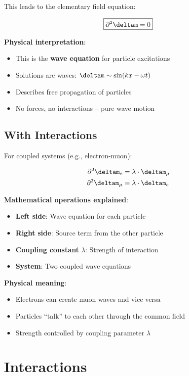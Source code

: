 	This leads to the elementary field equation:
	
	\begin{equation}
		\boxed{\partial^2 \deltam = 0}
		\label{eq:field_equation}
	\end{equation}
	
	\textbf{Physical interpretation}: 
	\begin{itemize}
		\item This is the \textbf{wave equation} for particle excitations
		\item Solutions are waves: $\deltam \sim \sin(kx - \omega t)$
		\item Describes free propagation of particles
		\item No forces, no interactions -- pure wave motion
	\end{itemize}
	
	\subsection{With Interactions}
	
	For coupled systems (e.g., electron-muon):
	
	\begin{align}
		\partial^2 \deltam_e &= \lambda \cdot \deltam_{\mu} \\
		\partial^2 \deltam_{\mu} &= \lambda \cdot \deltam_e
	\end{align}
	
	\textbf{Mathematical operations explained}:
	\begin{itemize}
		\item \textbf{Left side}: Wave equation for each particle
		\item \textbf{Right side}: Source term from the other particle
		\item \textbf{Coupling constant} $\lambda$: Strength of interaction
		\item \textbf{System}: Two coupled wave equations
	\end{itemize}
	
	\textbf{Physical meaning}:
	\begin{itemize}
		\item Electrons can create muon waves and vice versa
		\item Particles ``talk'' to each other through the common field
		\item Strength controlled by coupling parameter $\lambda$
	\end{itemize}

	\section{Interactions}
	
